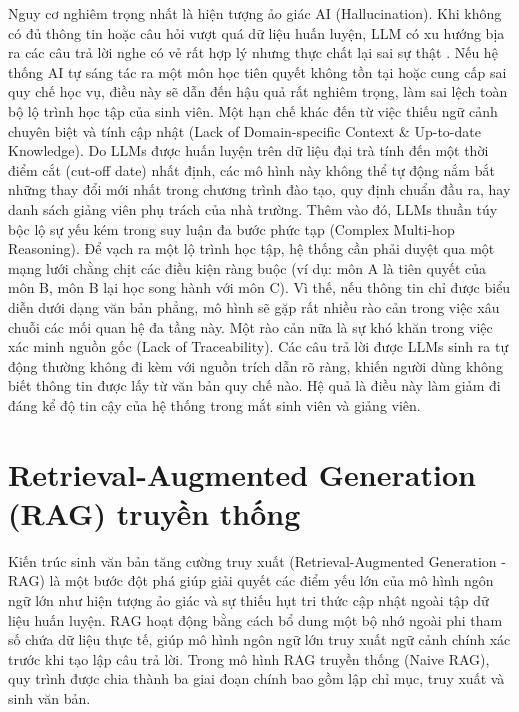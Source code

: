 Nguy cơ nghiêm trọng nhất là hiện tượng ảo giác AI (Hallucination). Khi không có đủ thông tin hoặc câu hỏi vượt quá dữ liệu huấn luyện, LLM có xu hướng bịa ra các câu trả lời nghe có vẻ rất hợp lý nhưng thực chất lại sai sự thật \cite{ji2023survey}. Nếu hệ thống AI tự sáng tác ra một môn học tiên quyết không tồn tại hoặc cung cấp sai quy chế học vụ, điều này sẽ dẫn đến hậu quả rất nghiêm trọng, làm sai lệch toàn bộ lộ trình học tập của sinh viên.
Một hạn chế khác đến từ việc thiếu ngữ cảnh chuyên biệt và tính cập nhật (Lack of Domain-specific Context \& Up-to-date Knowledge). Do LLMs được huấn luyện trên dữ liệu đại trà tính đến một thời điểm cắt (cut-off date) nhất định, các mô hình này không thể tự động nắm bắt những thay đổi mới nhất trong chương trình đào tạo, quy định chuẩn đầu ra, hay danh sách giảng viên phụ trách của nhà trường.
Thêm vào đó, LLMs thuần túy bộc lộ sự yếu kém trong suy luận đa bước phức tạp (Complex Multi-hop Reasoning). Để vạch ra một lộ trình học tập, hệ thống cần phải duyệt qua một mạng lưới chằng chịt các điều kiện ràng buộc (ví dụ: môn A là tiên quyết của môn B, môn B lại học song hành với môn C). Vì thế, nếu thông tin chỉ được biểu diễn dưới dạng văn bản phẳng, mô hình sẽ gặp rất nhiều rào cản trong việc xâu chuỗi các mối quan hệ đa tầng này.
Một rào cản nữa là sự khó khăn trong việc xác minh nguồn gốc (Lack of Traceability). Các câu trả lời được LLMs sinh ra tự động thường không đi kèm với nguồn trích dẫn rõ ràng, khiến người dùng không biết thông tin được lấy từ văn bản quy chế nào. Hệ quả là điều này làm giảm đi đáng kể độ tin cậy của hệ thống trong mắt sinh viên và giảng viên.

\section{Retrieval-Augmented Generation (RAG) truyền thống}
\indent Kiến trúc sinh văn bản tăng cường truy xuất (Retrieval-Augmented Generation - RAG) \cite{lewis2020rag} là một bước đột phá giúp giải quyết các điểm yếu lớn của mô hình ngôn ngữ lớn như hiện tượng ảo giác và sự thiếu hụt tri thức cập nhật ngoài tập dữ liệu huấn luyện. RAG hoạt động bằng cách bổ dung một bộ nhớ ngoài phi tham số chứa dữ liệu thực tế, giúp mô hình ngôn ngữ lớn truy xuất ngữ cảnh chính xác trước khi tạo lập câu trả lời. Trong mô hình RAG truyền thống (Naive RAG), quy trình được chia thành ba giai đoạn chính bao gồm lập chỉ mục, truy xuất và sinh văn bản.


